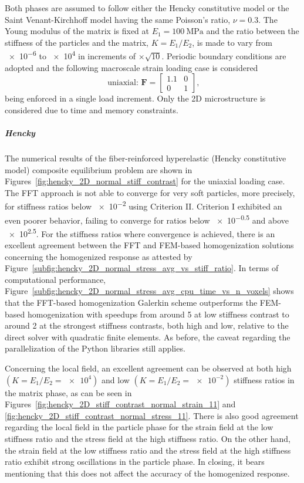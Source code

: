 Both phases are assumed to follow either the Hencky constitutive model or the Saint Venant-Kirchhoff model having the same Poisson's ratio, \(\nu=0.3\).
The Young modulus of the matrix is fixed at \(E_1=\SI{100}{\mega\pascal}\) and the ratio between the stiffness of the particles and the matrix, \(K=E_1/E_2\), is made to vary from \num{e-6} to \num{e4} in increments of \(\times \sqrt{10}\).
Periodic boundary conditions are adopted and the following macroscale strain loading case is considered
\begin{equation}
\text { uniaxial: } \bm{F}=\left[\begin{array}{cc}
1.1 & 0  \\
0 & 1
\end{array}\right],
\end{equation}
being enforced in a single load increment.
Only the 2D microstructure is considered due to time and memory constraints.

\subparagraph{Hencky}

The numerical results of the fiber-reinforced hyperelastic (Hencky constitutive model) composite equilibrium problem are shown in Figures~\ref{fig:hencky_2D_normal_stiff_contrast} for the uniaxial loading case.
The FFT approach is not able to converge for very soft particles, more precisely, for stiffness ratios below \num{e-2} using Criterion II.
Criterion I exhibited an even poorer behavior, failing to converge for ratios below \num{e-0.5} and above \num{e2.5}.
For the stiffness ratios where convergence is achieved, there is an excellent agreement between the FFT and FEM-based homogenization solutions concerning the homogenized response as attested by Figure~\ref{subfig:hencky_2D_normal_stress_avg_vs_stiff_ratio}.
In terms of computational performance, Figure~\ref{subfig:hencky_2D_normal_stress_avg_cpu_time_vs_n_voxels} shows that the FFT-based homogenization Galerkin scheme outperforms the FEM-based homogenization with speedups from around 5 at low stiffness contrast to around 2 at the strongest stiffness contrasts, both high and low, relative to the direct solver with quadratic finite elements.
As before, the caveat regarding the parallelization of the Python libraries still applies.

Concerning the local field, an excellent agreement can be observed at both high \((K=E_1/E_2=\num{e4})\) and low \((K=E_1/E_2=\num{e-2})\) stiffness ratios in the matrix phase, as can be seen in Figures~\ref{fig:hencky_2D_stiff_contrast_normal_strain_11} and \ref{fig:hencky_2D_stiff_contrast_normal_stress_11}.
There is also good agreement regarding the local field in the particle phase for the strain field at the low stiffness ratio and the stress field at the high stiffness ratio.
On the other hand, the strain field at the low stiffness ratio and the stress field at the high stiffness ratio exhibit strong oscillations in the particle phase.
In closing, it bears mentioning that this does not affect the accuracy of the homogenized response.

